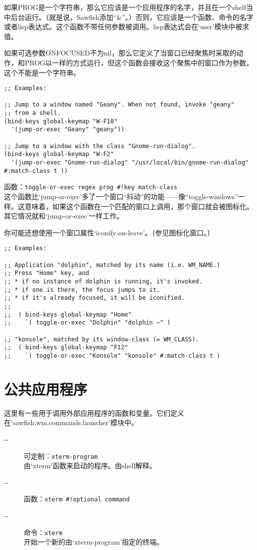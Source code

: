 \documentclass{book}
\begin{document}
\begin{CJK*}{UTF8}{gbsn}
\begin{description}
如果PROG是一个字符串，那么它应该是一个应用程序的名字，并且在一个shell当中后台运行。（就是说，Sawfish添加``\&''。）否则，它应该是一个函数、命令的名字或者lisp表达式。这个函数不带任何参数被调用。lisp表达式会在`user'模块中被求值。

如果可选参数ONFOCUSED不为nil，那么它定义了当窗口已经聚焦时采取的动作，和PROG以一样的方式运行，但这个函数会接收这个聚焦中的窗口作为参数。这个不能是一个字符串。
\begin{verbatim}
;; Examples:

;; Jump to a window named "Geany". When not found, invoke "geany"
;; from a shell.
(bind-keys global-keymap "W-F10"
  '(jump-or-exec "Geany" "geany"))

;; Jump to a window with the class "Gnome-run-dialog".
(bind-keys global-keymap "W-F2"
  '(jump-or-exec "Gnome-run-dialog" "/usr/local/bin/gnome-run-dialog" #:match-class t ))
\end{verbatim}
\item[-{}-] 函数：\verb|toggle-or-exec regex prog #!key match-class|\\
这个函数比`jump-or-exec'多了一个窗口``抖动''的功能------像``toggle-windows''一样。这意味着，如果这个函数在一个匹配的窗口上调用，那个窗口就会被图标化。其它情况就和`jump-or-exec'一样工作。

你可能还想使用一个窗口属性`iconify-on-leave'。（参见图标化窗口。）
\begin{verbatim}
;; Examples:

;; Application "dolphin", matched by its name (i.e. WM_NAME.)
;; Press "Home" key, and
;; * if no instance of dolphin is running, it's invoked.
;; * if one is there, the focus jumps to it.
;; * if it's already focused, it will be iconified.
;;
;;  ( bind-keys global-keymap "Home"
;;    `( toggle-or-exec "Dolphin" "dolphin ~" )

;; "konsole", matched by its window-class (= WM_CLASS).
;;  ( bind-keys global-keymap "F12"
;;    `( toggle-or-exec "Konsole" "konsole" #:match-class t )
\end{verbatim}
\end{description}
\section{公共应用程序}
这里有一些用于调用外部应用程序的函数和变量。它们定义在`sawfish.wm.commands.launcher'模块中。
\begin{description}
\item[-{}-] 可定制：\verb|xterm-program|\\
由`xterm'函数来启动的程序。由shell解释。
\item[-{}-] 函数：\verb|xterm #!optional command|
\item[-{}-] 命令：\verb|xterm|\\
开始一个新的由`xterm-program'指定的终端。


\end{description}
\end{CJK*}
\end{document}
